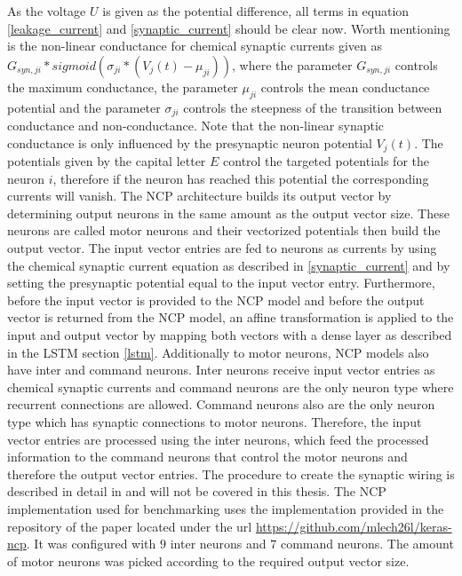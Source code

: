 \documentclass[draft,final]{vutinfth} %
\begin{document}
    As the voltage $U$ is given as the potential difference, all terms in equation \ref{leakage_current} and \ref{synaptic_current} should be clear now.
    Worth mentioning is the non-linear conductance for chemical synaptic currents given as $G_{syn,ji} * sigmoid(\sigma_{ji}*(V_j(t)-\mu_{ji}))$, where the parameter $G_{syn,ji}$ controls the maximum conductance, the parameter $\mu_{ji}$ controls the mean conductance potential and the parameter $\sigma_{ji}$ controls the steepness of the transition between conductance and non-conductance.
    Note that the non-linear synaptic conductance is only influenced by the presynaptic neuron potential $V_j(t)$.
    The potentials given by the capital letter $E$ control the targeted potentials for the neuron $i$, therefore if the neuron has reached this potential the corresponding currents will vanish. 
    The NCP architecture builds its output vector by determining output neurons in the same amount as the output vector size.
    These neurons are called motor neurons and their vectorized potentials then build the output vector.
    The input vector entries are fed to neurons as currents by using the chemical synaptic current equation as described in \ref{synaptic_current} and by setting the presynaptic potential equal to the input vector entry.
    Furthermore, before the input vector is provided to the NCP model and before the output vector is returned from the NCP model, an affine transformation is applied to the input and output vector by mapping both vectors with a dense layer as described in the LSTM section \ref{lstm}.
    Additionally to motor neurons, NCP models also have inter and command neurons.
    Inter neurons receive input vector entries as chemical synaptic currents and command neurons are the only neuron type where recurrent connections are allowed.
    Command neurons also are the only neuron type which has synaptic connections to motor neurons.
    Therefore, the input vector entries are processed using the inter neurons, which feed the processed information to the command neurons that control the motor neurons and therefore the output vector entries.
    The procedure to create the synaptic wiring is described in detail in \cite[p. 3]{NCP} and will not be covered in this thesis.
    The NCP implementation used for benchmarking uses the implementation provided in the repository of the paper \cite{NCP} located under the url \url{https://github.com/mlech26l/keras-ncp}.
    It was configured with $9$ inter neurons and $7$ command neurons. The amount of motor neurons was picked according to the required output vector size.
\end{document}
